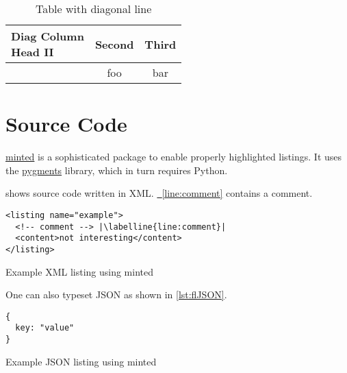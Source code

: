 \documentclass[
  numbers=noenddot,
  english,  %
  a4paper,  %
  twoside,  %
  bibliography=totoc,
  headsepline,
  cleardoublepage=empty,
  parskip=half,
  draft=false
]{scrbook}
\theoremstyle{break}
\newcommand{\labelline}[1]{\label[line]{#1}\hypertarget{#1}{}}
\newcommand{\refline}[1]{\hyperlink{#1}{\FancyVerbLineautorefname~\ref*{#1}}}
\begin{document}
\begin{ltgexample}
\begin{table}
  \caption{Table with diagonal line}
  \label{tab:diag}
  \begin{center}
    \begin{tabular}{|l|c|c|}
      \hline
      \diagbox[width=10em]{Diag \\Column Head I}{Diag Column\\Head II} & Second & Third \\
      \hline
       & foo & bar              \\
      \hline
    \end{tabular}
  \end{center}
\end{table}
\end{ltgexample}


\section{Source Code}

\href{https://github.com/gpoore/minted}{minted} is a sophisticated package to enable properly highlighted listings.
It uses the \href{http://pygments.org/}{pygments} library, which in turn requires Python.

\begin{ltgexample}
 shows source code written in XML.
\refline{line:comment} contains a comment.

\begin{listing}[htbp]
  \begin{verbatim}
<listing name="example">
  <!-- comment --> |\labelline{line:comment}|
  <content>not interesting</content>
</listing>
\end{verbatim}
  \caption{Example XML listing using minted}
  \label{lst:XML}
\end{listing}
\end{ltgexample}

One can also typeset JSON as shown in \cref{lst:flJSON}.

\begin{ltgexample}
\begin{listing}[htbp]
  \begin{verbatim}
{
  key: "value"
}
\end{verbatim}
  \caption{Example JSON listing using minted}
  \label{lst:flJSON}
\end{listing}
\end{ltgexample}
\end{document}
